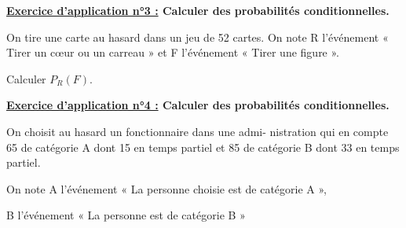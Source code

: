 \documentclass[12pt]{article}
\begin{document}
\begin{mdframed}[
    linewidth=1pt,
    linecolor=RoyalBlue,
    innertopmargin=10pt,
    innerbottommargin=10pt
]
{\color{RoyalBlue}\textbf{\underline{Exercice d'application n°3 :} 
Calculer des probabilités conditionnelles.}}
\vspace{5pt}

\hspace{1cm} On tire une carte au hasard dans un jeu de 52 cartes. On note R l'événement
« Tirer un cœur ou un carreau » et F l'événement « Tirer une figure ».

\vspace{5pt}
Calculer $P_R(F)$.

\vspace{0.5cm}
{\color{black!27}\dotfill}

\vspace{0.5cm}
{\color{black!27}\dotfill}

\vspace{0.5cm}
{\color{black!27}\dotfill}

\vspace{0.5cm}
{\color{black!27}\dotfill}

\vspace{0.5cm}
{\color{black!27}\dotfill}

\vspace{0.5cm}
{\color{black!30}\dotfill}

\vspace{0.5cm}
{\color{black!30}\dotfill}

\vspace{0.5cm}
{\color{black!30}\dotfill}

\vspace{0.5cm}
{\color{black!30}\dotfill}


\vspace{20pt}

{\color{RoyalBlue}\textbf{\underline{Exercice d'application n°4 :} 
Calculer des probabilités conditionnelles.}}

\vspace{5pt}
\hspace{1cm} On choisit au hasard un fonctionnaire dans une admi- nistration qui en 
compte 65 de catégorie A dont 15 en temps partiel et 85 de catégorie B dont 33 en temps 
partiel. 

\vspace{5pt}
On note A l'événement « La personne choisie est de catégorie A », 

B l'événement « La personne est de catégorie B » 


\end{mdframed}
\end{document}
